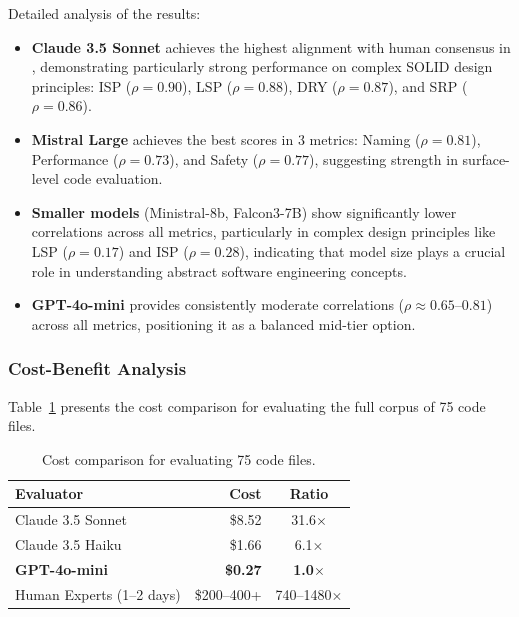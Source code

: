 Detailed analysis of the results:
\begin{itemize}
    \item \textbf{Claude 3.5 Sonnet} achieves the highest alignment with human consensus in , demonstrating particularly strong performance on complex SOLID design principles: ISP ($\rho = 0.90$), LSP ($\rho = 0.88$), DRY ($\rho = 0.87$), and SRP ($\rho = 0.86$).
    \item \textbf{Mistral Large} achieves the best scores in 3 metrics: Naming ($\rho = 0.81$), Performance ($\rho = 0.73$), and Safety ($\rho = 0.77$), suggesting strength in surface-level code evaluation.
    \item \textbf{Smaller models} (Ministral-8b, Falcon3-7B) show significantly lower correlations across all metrics, particularly in complex design principles like LSP ($\rho = 0.17$) and ISP ($\rho = 0.28$), indicating that model size plays a crucial role in understanding abstract software engineering concepts.
    \item \textbf{GPT-4o-mini} provides consistently moderate correlations ($\rho \approx 0.65$--$0.81$) across all metrics, positioning it as a balanced mid-tier option.
\end{itemize}

\subsubsection{Cost-Benefit Analysis}
Table~\ref{tab:cost_analysis} presents the cost comparison for evaluating the full corpus of 75 code files.

\begin{table}[h]
    \centering
    \caption{Cost comparison for evaluating 75 code files.}
    \label{tab:cost_analysis}
    \small
    \begin{tabular}{lrc}
        \toprule
        \textbf{Evaluator} & \textbf{Cost} & \textbf{Ratio} \\
        \midrule
        Claude 3.5 Sonnet & \$8.52 & 31.6$\times$ \\
        Claude 3.5 Haiku & \$1.66 & 6.1$\times$ \\
        \rowcolor{techBlue!10}
        \textbf{GPT-4o-mini} & \textbf{\$0.27} & \textbf{1.0$\times$} \\
        Human Experts (1--2 days) & \$200--400+ & 740--1480$\times$ \\
        \bottomrule
    \end{tabular}
\end{table}

